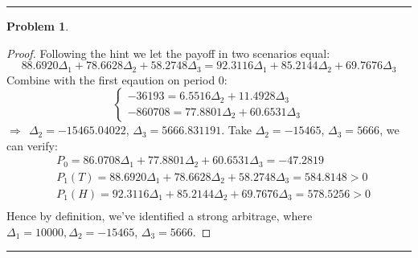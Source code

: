 \documentclass[a4paper, 10pt]{article}
\theoremstyle{definition}
\newtheorem{problem}{Problem}
\theoremstyle{hSol}
\begin{document}
\noindent\rule{16cm}{0.4pt}

\begin{problem} 
\end{problem}
\begin{proof} Following the hint we let the payoff in two scenarios equal:
\begin{equation}
  88.6920\Delta_1 +  78.6628\Delta_2 + 58.2748\Delta_3 = 92.3116\Delta_1 + 85.2144\Delta_2 + 69.7676\Delta_3
\end{equation}
Combine with the first eqaution on period 0:
$$
\begin{cases}
  -36193 = 6.5516\Delta_2 + 11.4928\Delta_3 \\
  -860708 = 77.8801\Delta_2 + 60.6531\Delta_3 
\end{cases}
$$
$\Rightarrow~~\Delta_2 = -15465.04022$, $\Delta_3=5666.831191$. Take $\Delta_2 = -15465$, $\Delta_3=5666$, we can verify:
\begin{equation}
  \begin{split}
    &P_0 = 86.0708\Delta_1 + 77.8801\Delta_2 + 60.6531\Delta_3 = -47.2819\\
    &P_1(T) = 88.6920\Delta_1 + 78.6628\Delta_2 + 58.2748\Delta_3 = 584.8148>0\\
    &P_1(H) = 92.3116\Delta_1 + 85.2144\Delta_2 + 69.7676\Delta_3 = 578.5256>0\\
  \end{split}
\end{equation}
Hence by definition, we've identified a strong arbitrage, where $\Delta_1 = 10000, \Delta_2 = -15465$, $\Delta_3=5666$.
\end{proof}

\noindent\rule{16cm}{0.4pt}
\end{document}
